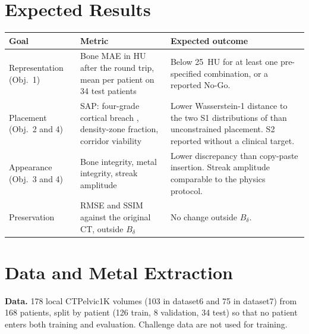 \documentclass[9pt]{extarticle}
\begin{document}
\section{Expected Results}

\begin{table}[h]
\centering
\small
\begin{tabularx}{\linewidth}{@{}p{2.9cm} p{5.2cm} X@{}}
\toprule
\textbf{Goal} & \textbf{Metric} & \textbf{Expected outcome} \\
\midrule
Representation (Obj.~1) & Bone MAE in HU after the round trip, mean per patient on 34 test patients & Below 25~HU for at least one pre-specified combination, or a reported No-Go. \\
Placement (Obj.~2 and 4) & SAP: four-grade cortical breach \citep{smith2006iliosacral}, density-zone fraction, corridor viability \citep{mclaren2021corridor} & Lower Wasserstein-1 distance to the two S1 distributions of \citet{zwingmann2009navigated} than unconstrained placement. S2 reported without a clinical target. \\
Appearance (Obj.~3 and 4) & Bone integrity, metal integrity, streak amplitude \citep{peters2025hybrid} & Lower discrepancy than copy-paste insertion. Streak amplitude comparable to the physics protocol. \\
Preservation & RMSE and SSIM against the original CT, outside $B_{\delta}$ & No change outside $B_{\delta}$. \\
\bottomrule
\end{tabularx}
\end{table}

\section{Data and Metal Extraction}

\textbf{Data.} 178 local CTPelvic1K volumes (103 in dataset6 and 75 in dataset7) from 168 patients, split by patient (126 train, 8 validation, 34 test) so that no patient enters both training and evaluation. Challenge data \citep{haneda2025aapm} are not used for training.
\end{document}
